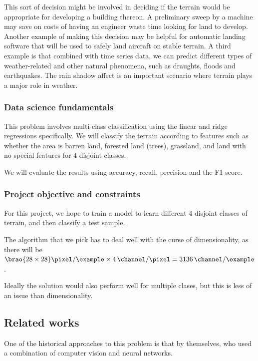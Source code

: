 \documentclass[11pt]{report}
\DeclarePairedDelimiter\brao()%
\begin{document}
This sort of decision might be involved in deciding if the terrain would be appropriate for developing a building thereon.
A preliminary sweep by a machine may save on costs of having an engineer waste time looking for land to develop.
Another example of making this decision may be helpful for automatic landing software that will be used to safely land aircraft on stable terrain.
A third example is that combined with time series data, we can predict different types
of weather-related and other natural phenomena,
such as draughts, floods and earthquakes.
The rain shadow affect is an important scenario where terrain plays a major role in weather.

\subsubsection{Data science fundamentals}

This problem involves multi-class classification
using the linear and ridge regressions specifically.
We will classify the terrain according to features such as whether the area is
barren land, forested land (trees), grassland, and land with no special features
for \(4\) disjoint classes.

We will evaluate the results using
accuracy, recall, precision and the F1 score.

\subsubsection{Project objective and constraints}

For this project, we hope to train a model to learn different \(4\) disjoint classes of terrain, and then classify a test sample.

The algorithm that we pick has to deal well with the curse of dimensionality,
as there will be
\(
    \SI[parse-numbers=false]{\brao{28\times28}\!}{\pixel\per\example}
    \times \SI4{\channel\per\pixel}
    = \SI{3136}{\channel\per\example}
\).

Ideally the solution would also perform well for multiple clases,
but this is less of an issue than dimensionality.

\subsection{Related works}\label{ssc:related works}

One of the historical approaches to this problem is that by \textcite{Basu2015a} themselves,
who
used a combination of computer vision and neural networks.
\end{document}
